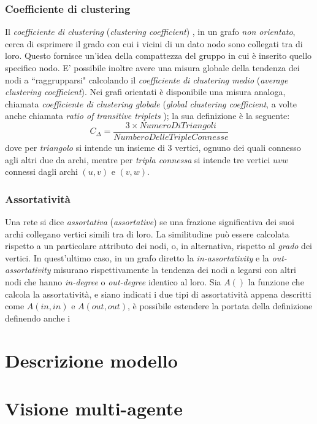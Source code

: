\documentclass[a4paper,12pt]{article}
\begin{document}
\subsubsection{Coefficiente di clustering}
Il \textit{coefficiente di clustering} (\textit{clustering coefficient}) \cite{barabasi}, in un grafo \textit{non orientato}, cerca di esprimere il grado con cui i vicini di un dato nodo sono collegati tra di loro. Questo fornisce un'idea della compattezza del gruppo in cui è inserito quello specifico nodo. E' possibile inoltre avere una misura globale della tendenza dei nodi a ``raggrupparsi" calcolando il \textit{coefficiente di clustering medio} (\textit{average clustering coefficient}). Nei grafi orientati  \cite{newman} è disponibile una misura analoga, chiamata \textit{coefficiente di clustering globale} (\textit{global clustering coefficient}, a volte anche chiamata \textit{ratio of transitive triplets} \cite{barabasi}); la sua definizione è la seguente:
\begin{equation}
C_\Delta=\dfrac{3\times NumeroDiTriangoli}{NumberoDelleTripleConnesse}
\end{equation}
dove per \textit{triangolo} si intende un insieme di $3$ vertici, ognuno dei quali connesso agli altri due da archi, mentre per \textit{tripla connessa} si intende tre vertici $uvw$ connessi dagli archi $(u,v)$ e $(v,w)$.
\subsubsection{Assortatività}
Una rete si dice \textit{assortativa} (\textit{assortative}) \cite{newman} se 
una frazione significativa dei suoi archi collegano vertici simili tra di loro. La similitudine può essere calcolata rispetto a un particolare attributo dei nodi, o, in alternativa, rispetto al \textit{grado} dei vertici. In quest'ultimo caso, in un grafo diretto \cite{assor} la \textit{in-assortativity} e la \textit{out-assortativity} misurano rispettivamente la tendenza dei nodi a legarsi con altri nodi che hanno \textit{in-degree} o \textit{out-degree} identico al loro. Sia $A()$ la funzione che calcola la assortatività, e siano indicati i due tipi di assortatività appena descritti come $A(in,in)$ e $A(out,out)$, è possibile estendere la portata della definizione definendo anche i
\section{Descrizione modello} 
\label{sec:mod}
\section{Visione multi-agente}
\label{sec:mas}
\end{document}
